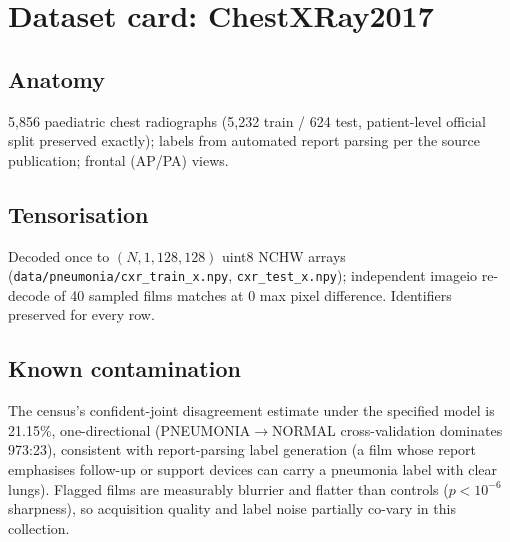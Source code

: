 
\section{Dataset card: ChestXRay2017}
\subsection{Anatomy}
5{,}856 paediatric chest radiographs (5{,}232 train / 624 test,
patient-level official split preserved exactly); labels from automated
report parsing per the source publication; frontal (AP/PA) views.
\subsection{Tensorisation}
Decoded once to $(N, 1, 128, 128)$ uint8 NCHW arrays
(\texttt{data/pneumonia/cxr\_train\_x.npy}, \texttt{cxr\_test\_x.npy});
independent imageio re-decode of 40 sampled films matches at 0 max pixel
difference. Identifiers preserved for every row.
\subsection{Known contamination}
The census's confident-joint disagreement estimate under the specified model is 21.15\%, one-directional
(PNEUMONIA$\to$NORMAL cross-validation dominates 973:23), consistent with
report-parsing label generation (a film whose report emphasises follow-up
or support devices can carry a pneumonia label with clear lungs).
Flagged films are measurably blurrier and flatter than controls
($p < 10^{-6}$ sharpness), so acquisition quality and label noise
partially co-vary in this collection.
